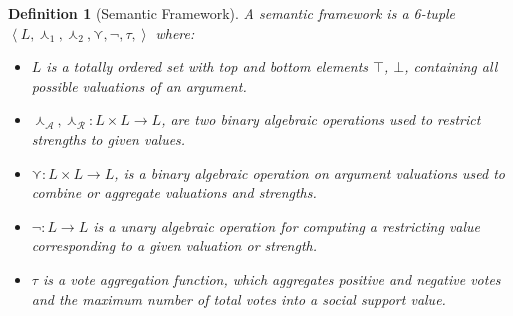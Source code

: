 \documentclass{article}
\newtheorem{definition}{Definition}
\newcommand{\nat}{\mathbb{N}}   %
\newcommand{\args}{\mathcal{A}} %
\newcommand{\att}{\mathcal{R}}  %
\newcommand{\valueset}{L}
\newcommand{\sembodyNew}{\left\langle \valueset,\SAFand_1, \SAFand_2,\SAFor,\lnot,\tau, \right\rangle} %
\newcommand{\SAFand}{\curlywedge}     %
\newcommand{\SAFor}{\curlyvee}        %
\begin{document}
\begin{definition}[Semantic Framework]
\label{def:semfram}
A semantic framework is a 6-tuple \\$\sembodyNew$ where:

\begin{itemize}
  \item $\valueset$ is a totally ordered set with top and bottom elements $\top$, 
$\bot$, containing all possible valuations of an argument. 

  \item $\SAFand_\args,\SAFand_\att:\valueset\times \valueset\rightarrow \valueset$, are two binary algebraic operations used to restrict strengths to given values.
  
  \item $\SAFor:\valueset\times \valueset\rightarrow \valueset$, is a binary algebraic operation on argument valuations used to combine or aggregate valuations and strengths.
  
  \item $\lnot:\valueset\rightarrow \valueset$ is a unary algebraic operation for computing a restricting value corresponding to a given valuation or strength.
  
  \item $\tau$ is a vote aggregation function, which aggregates positive and negative votes and the maximum number of total votes into a social support value.

\end{itemize}
\end{definition}
\end{document}
